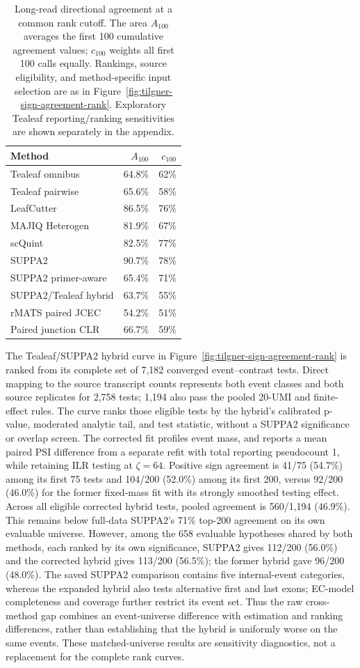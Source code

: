\documentclass[11pt]{article}
\begin{document}
\begin{table}[H]
\centering
\small
\caption{Long-read directional agreement at a common rank cutoff. The area \(A_{100}\) averages the first 100 cumulative agreement values; \(c_{100}\) weights all first 100 calls equally. Rankings, source eligibility, and method-specific input selection are as in Figure~\ref{fig:tilgner-sign-agreement-rank}. Exploratory Tealeaf reporting/ranking sensitivities are shown separately in the appendix.}
\label{tab:lr-rank-summary}
\begin{tabular}{lrr}
\toprule
Method & \(A_{100}\) & \(c_{100}\)\\
\midrule
Tealeaf omnibus & 64.8\% & 62\%\\
Tealeaf pairwise & 65.6\% & 58\%\\
LeafCutter & 86.5\% & 76\%\\
MAJIQ Heterogen & 81.9\% & 67\%\\
scQuint & 82.5\% & 77\%\\
SUPPA2 & 90.7\% & 78\%\\
SUPPA2 primer-aware & 65.4\% & 71\%\\
SUPPA2/Tealeaf hybrid & 63.7\% & 55\%\\
rMATS paired JCEC & 54.2\% & 51\%\\
Paired junction CLR & 66.7\% & 59\%\\
\bottomrule
\end{tabular}
\end{table}

The Tealeaf/SUPPA2 hybrid curve in Figure~\ref{fig:tilgner-sign-agreement-rank} is ranked from its complete set of 7,182 converged event--contrast tests. Direct mapping to the source transcript counts represents both event classes and both source replicates for 2,758 tests; 1,194 also pass the pooled 20-UMI and finite-effect rules. The curve ranks those eligible tests by the hybrid's calibrated p-value, moderated analytic tail, and test statistic, without a SUPPA2 significance or overlap screen. The corrected fit profiles event mass, and reports a mean paired PSI difference from a separate refit with total reporting pseudocount 1, while retaining ILR testing at \(\zeta=64\). Positive sign agreement is 41/75 (54.7\%) among its first 75 tests and 104/200 (52.0\%) among its first 200, versus 92/200 (46.0\%) for the former fixed-mass fit with its strongly smoothed testing effect. Across all eligible corrected hybrid tests, pooled agreement is 560/1,194 (46.9\%). This remains below full-data SUPPA2's 71\% top-200 agreement on its own evaluable universe. However, among the 658 evaluable hypotheses shared by both methods, each ranked by its own significance, SUPPA2 gives 112/200 (56.0\%) and the corrected hybrid gives 113/200 (56.5\%); the former hybrid gave 96/200 (48.0\%). The saved SUPPA2 comparison contains five internal-event categories, whereas the expanded hybrid also tests alternative first and last exons; EC-model completeness and coverage further restrict its event set. Thus the raw cross-method gap combines an event-universe difference with estimation and ranking differences, rather than establishing that the hybrid is uniformly worse on the same events. These matched-universe results are sensitivity diagnostics, not a replacement for the complete rank curves.
\end{document}
